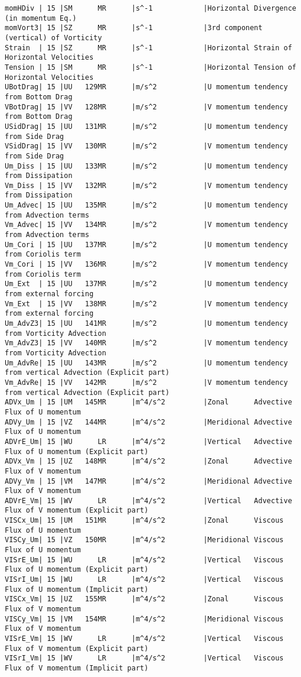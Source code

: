 \begin{verbatim}
momHDiv | 15 |SM      MR      |s^-1            |Horizontal Divergence (in momentum Eq.)
momVort3| 15 |SZ      MR      |s^-1            |3rd component (vertical) of Vorticity
Strain  | 15 |SZ      MR      |s^-1            |Horizontal Strain of Horizontal Velocities
Tension | 15 |SM      MR      |s^-1            |Horizontal Tension of Horizontal Velocities
UBotDrag| 15 |UU   129MR      |m/s^2           |U momentum tendency from Bottom Drag
VBotDrag| 15 |VV   128MR      |m/s^2           |V momentum tendency from Bottom Drag
USidDrag| 15 |UU   131MR      |m/s^2           |U momentum tendency from Side Drag
VSidDrag| 15 |VV   130MR      |m/s^2           |V momentum tendency from Side Drag
Um_Diss | 15 |UU   133MR      |m/s^2           |U momentum tendency from Dissipation
Vm_Diss | 15 |VV   132MR      |m/s^2           |V momentum tendency from Dissipation
Um_Advec| 15 |UU   135MR      |m/s^2           |U momentum tendency from Advection terms
Vm_Advec| 15 |VV   134MR      |m/s^2           |V momentum tendency from Advection terms
Um_Cori | 15 |UU   137MR      |m/s^2           |U momentum tendency from Coriolis term
Vm_Cori | 15 |VV   136MR      |m/s^2           |V momentum tendency from Coriolis term
Um_Ext  | 15 |UU   137MR      |m/s^2           |U momentum tendency from external forcing
Vm_Ext  | 15 |VV   138MR      |m/s^2           |V momentum tendency from external forcing
Um_AdvZ3| 15 |UU   141MR      |m/s^2           |U momentum tendency from Vorticity Advection
Vm_AdvZ3| 15 |VV   140MR      |m/s^2           |V momentum tendency from Vorticity Advection
Um_AdvRe| 15 |UU   143MR      |m/s^2           |U momentum tendency from vertical Advection (Explicit part)
Vm_AdvRe| 15 |VV   142MR      |m/s^2           |V momentum tendency from vertical Advection (Explicit part)
ADVx_Um | 15 |UM   145MR      |m^4/s^2         |Zonal      Advective Flux of U momentum
ADVy_Um | 15 |VZ   144MR      |m^4/s^2         |Meridional Advective Flux of U momentum
ADVrE_Um| 15 |WU      LR      |m^4/s^2         |Vertical   Advective Flux of U momentum (Explicit part)
ADVx_Vm | 15 |UZ   148MR      |m^4/s^2         |Zonal      Advective Flux of V momentum
ADVy_Vm | 15 |VM   147MR      |m^4/s^2         |Meridional Advective Flux of V momentum
ADVrE_Vm| 15 |WV      LR      |m^4/s^2         |Vertical   Advective Flux of V momentum (Explicit part)
VISCx_Um| 15 |UM   151MR      |m^4/s^2         |Zonal      Viscous Flux of U momentum
VISCy_Um| 15 |VZ   150MR      |m^4/s^2         |Meridional Viscous Flux of U momentum
VISrE_Um| 15 |WU      LR      |m^4/s^2         |Vertical   Viscous Flux of U momentum (Explicit part)
VISrI_Um| 15 |WU      LR      |m^4/s^2         |Vertical   Viscous Flux of U momentum (Implicit part)
VISCx_Vm| 15 |UZ   155MR      |m^4/s^2         |Zonal      Viscous Flux of V momentum
VISCy_Vm| 15 |VM   154MR      |m^4/s^2         |Meridional Viscous Flux of V momentum
VISrE_Vm| 15 |WV      LR      |m^4/s^2         |Vertical   Viscous Flux of V momentum (Explicit part)
VISrI_Vm| 15 |WV      LR      |m^4/s^2         |Vertical   Viscous Flux of V momentum (Implicit part)
\end{verbatim}
